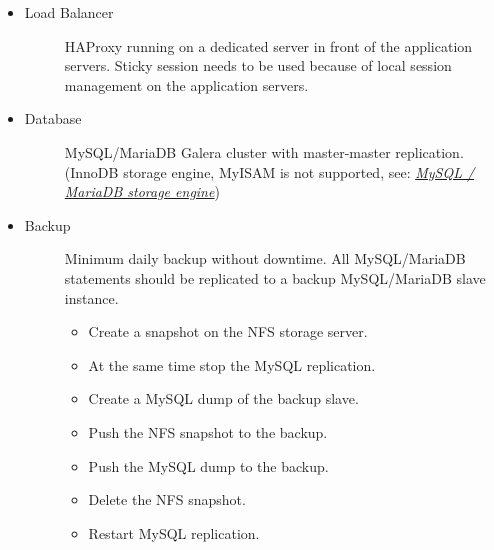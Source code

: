 \documentclass[letterpaper,10pt,english]{sphinxmanual}
\begin{document}
\begin{itemize}
\begin{description}
\end{description}

\item {} \begin{description}
\item[{Load Balancer}] \leavevmode
HAProxy running on a dedicated server in front of the application servers.
Sticky session needs to be used because of local session management on the
application servers.

\end{description}

\item {} \begin{description}
\item[{Database}] \leavevmode
MySQL/MariaDB Galera cluster with master-master replication. (InnoDB storage engine, MyISAM is not supported, see: {\hyperref[configuration_database/linux_database_configuration:db\string-storage\string-engine\string-label]{\emph{MySQL / MariaDB storage engine}}})

\end{description}

\item {} \begin{description}
\item[{Backup}] \leavevmode
Minimum daily backup without downtime. All MySQL/MariaDB statements should
be replicated to a backup MySQL/MariaDB slave instance.
\begin{itemize}
\item {} 
Create a snapshot on the NFS storage server.

\item {} 
At the same time stop the MySQL replication.

\item {} 
Create a MySQL dump of the backup slave.

\item {} 
Push the NFS snapshot to the backup.

\item {} 
Push the MySQL dump to the backup.

\item {} 
Delete the NFS snapshot.

\item {} 
Restart MySQL replication.

\end{itemize}

\end{description}


\end{itemize}
\end{document}

